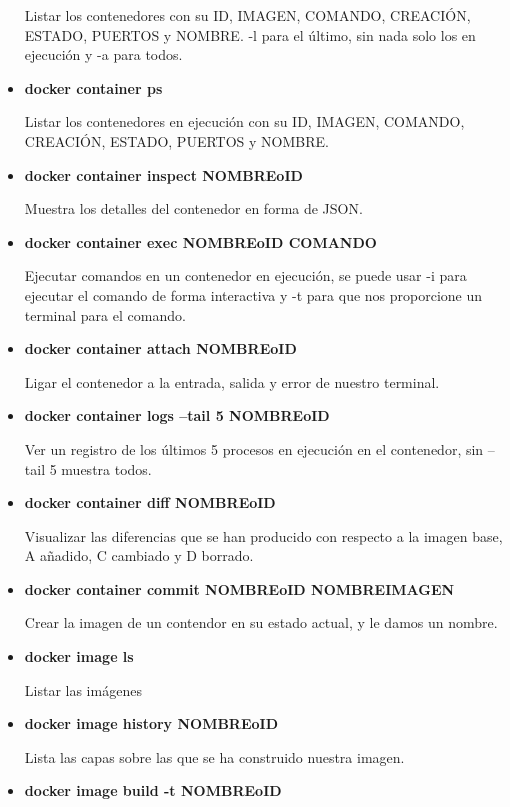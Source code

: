 \documentclass[12pt, twoside, openright]{report} %
\begin{document}
\begin{itemize}
	      Listar los contenedores con su ID, IMAGEN, COMANDO, CREACIÓN, ESTADO, PUERTOS y NOMBRE.
	      -l para el último, sin nada solo los en ejecución y -a para todos.

	\item \textbf{docker container ps}

	      Listar los contenedores en ejecución con su ID, IMAGEN, COMANDO, CREACIÓN, ESTADO, PUERTOS y NOMBRE.

	\item \textbf{docker container inspect NOMBREoID}

	      Muestra los detalles del contenedor en forma de JSON.

	\item \textbf{docker container exec NOMBREoID COMANDO}

	      Ejecutar comandos en un contenedor en ejecución, se puede usar -i para ejecutar el comando de forma interactiva y -t para que nos proporcione un terminal para el comando.

	\item \textbf{docker container attach NOMBREoID}

	      Ligar el contenedor a la entrada, salida y error de nuestro terminal.

	\item \textbf{docker container logs --tail 5 NOMBREoID}

	      Ver un registro de los últimos 5 procesos en ejecución en el contenedor, sin --tail 5 muestra todos.

	\item \textbf{docker container diff NOMBREoID}

	      Visualizar las diferencias que se han producido con respecto a la imagen base, A añadido, C cambiado y D borrado.

	\item \textbf{docker container commit NOMBREoID NOMBREIMAGEN}

	      Crear la imagen de un contendor en su estado actual, y le damos un nombre.

	\item \textbf{docker image ls}

	      Listar las imágenes

	\item \textbf{docker image history NOMBREoID}

	      Lista las capas sobre las que se ha construido nuestra imagen.

	\item \textbf{docker image build -t NOMBREoID}


\end{itemize}
\end{document}

